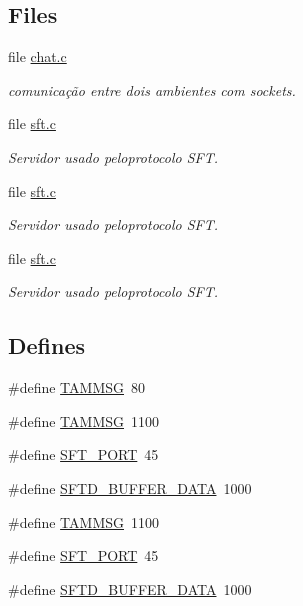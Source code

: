 \subsection*{Files}
\begin{DoxyCompactItemize}
\item 
file \hyperlink{chat_8c}{chat.c}


\begin{DoxyCompactList}\small\item\em comunicação entre dois ambientes com sockets. \item\end{DoxyCompactList}

\item 
file \hyperlink{sft_8c}{sft.c}


\begin{DoxyCompactList}\small\item\em Servidor usado peloprotocolo SFT. \item\end{DoxyCompactList}

\item 
file \hyperlink{sft_8c}{sft.c}


\begin{DoxyCompactList}\small\item\em Servidor usado peloprotocolo SFT. \item\end{DoxyCompactList}

\item 
file \hyperlink{sft_8c}{sft.c}


\begin{DoxyCompactList}\small\item\em Servidor usado peloprotocolo SFT. \item\end{DoxyCompactList}

\end{DoxyCompactItemize}
\subsection*{Defines}
\begin{DoxyCompactItemize}
\item 
\#define \hyperlink{group__tools_gafeedb41f2b3a57bebfb2f7b06e740ff9}{TAMMSG}~80
\item 
\#define \hyperlink{group__tools_gafeedb41f2b3a57bebfb2f7b06e740ff9}{TAMMSG}~1100
\item 
\#define \hyperlink{group__tools_gad5edc192bf3e9fd388921b3d378c24a0}{SFT\_\-PORT}~45
\item 
\#define \hyperlink{group__tools_ga7bbd4dd96f752e1a658cd868530e3fdd}{SFTD\_\-BUFFER\_\-DATA}~1000
\item 
\#define \hyperlink{group__tools_gafeedb41f2b3a57bebfb2f7b06e740ff9}{TAMMSG}~1100
\item 
\#define \hyperlink{group__tools_gad5edc192bf3e9fd388921b3d378c24a0}{SFT\_\-PORT}~45
\item 
\#define \hyperlink{group__tools_ga7bbd4dd96f752e1a658cd868530e3fdd}{SFTD\_\-BUFFER\_\-DATA}~1000
\end{DoxyCompactItemize}
